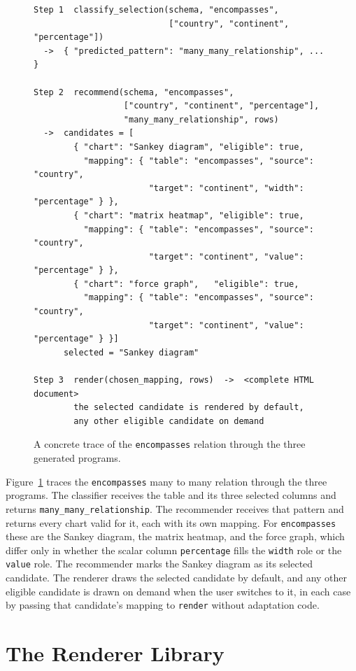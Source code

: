 \begin{figure}[htbp]
\begin{lstlisting}[style=prompt]
Step 1  classify_selection(schema, "encompasses",
                           ["country", "continent", "percentage"])
  ->  { "predicted_pattern": "many_many_relationship", ... }

Step 2  recommend(schema, "encompasses",
                  ["country", "continent", "percentage"],
                  "many_many_relationship", rows)
  ->  candidates = [
        { "chart": "Sankey diagram", "eligible": true,
          "mapping": { "table": "encompasses", "source": "country",
                       "target": "continent", "width": "percentage" } },
        { "chart": "matrix heatmap", "eligible": true,
          "mapping": { "table": "encompasses", "source": "country",
                       "target": "continent", "value": "percentage" } },
        { "chart": "force graph",   "eligible": true,
          "mapping": { "table": "encompasses", "source": "country",
                       "target": "continent", "value": "percentage" } }]
      selected = "Sankey diagram"

Step 3  render(chosen_mapping, rows)  ->  <complete HTML document>
        the selected candidate is rendered by default,
        any other eligible candidate on demand
\end{lstlisting}
\caption{A concrete trace of the \texttt{encompasses} relation through the three generated programs.}
\label{lst:contracts}
\end{figure}

Figure~\ref{lst:contracts} traces the \texttt{encompasses} many to many relation through the three programs. The classifier receives the table and its three selected columns and returns \texttt{many\_many\_relationship}. The recommender receives that pattern and returns every chart valid for it, each with its own mapping. For \texttt{encompasses} these are the Sankey diagram, the matrix heatmap, and the force graph, which differ only in whether the scalar column \texttt{percentage} fills the \texttt{width} role or the \texttt{value} role. The recommender marks the Sankey diagram as its selected candidate. The renderer draws the selected candidate by default, and any other eligible candidate is drawn on demand when the user switches to it, in each case by passing that candidate's mapping to \texttt{render} without adaptation code.




\section{The Renderer Library}
\label{sec:impl-renderers}

